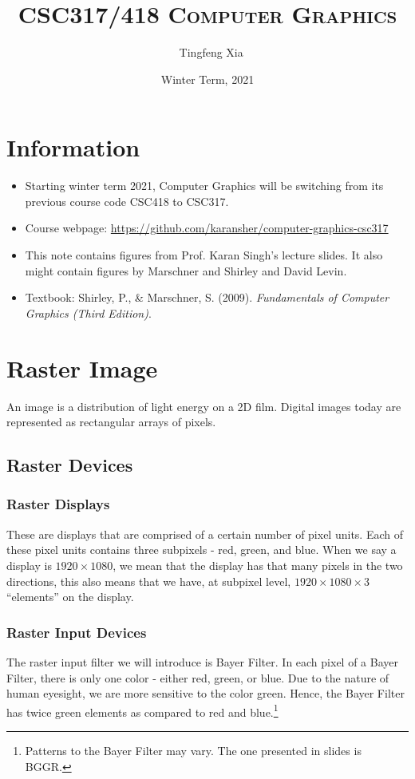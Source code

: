 \documentclass[11pt]{article}
\author{\ccLogo\,\, Tingfeng Xia}
\title{\textsc{CSC317/418 Computer Graphics}}
\date{Winter Term, 2021}
\begin{document}
\maketitle
\doclicenseThis
\section*{Information}
\begin{itemize}
	\item Starting winter term 2021, Computer Graphics will be switching from its previous course code CSC418 to CSC317. 
	\item Course webpage: \url{https://github.com/karansher/computer-graphics-csc317}
	\item This note contains figures from Prof. Karan Singh's lecture slides. It also might contain figures by Marschner and Shirley and David Levin. 
	\item Textbook: Shirley, P., \& Marschner, S. (2009). \textit{Fundamentals of Computer Graphics (Third Edition)}. 
\end{itemize}
\tableofcontents
\section{Raster Image}
An image is a distribution of light energy on a 2D film. Digital images today are represented as rectangular arrays of pixels. 
\subsection{Raster Devices}
\subsubsection{Raster Displays} These are displays that are comprised of a certain number of pixel units. Each of these pixel units contains three subpixels - red, green, and blue. When we say a display is $1920 \times 1080$, we mean that the display has that many pixels in the two directions, this also means that we have, at subpixel level, $1920 \times 1080 \times 3$ ``elements'' on the display. 

\subsubsection{Raster Input Devices}
The raster input filter we will introduce is Bayer Filter. In each pixel of a Bayer Filter, there is only one color - either red, green, or blue. Due to the nature of human eyesight, we are more sensitive to the color green. Hence, the Bayer Filter has twice green elements as compared to red and blue.\footnote{Patterns to the Bayer Filter may vary. The one presented in slides is BGGR.}
\end{document}
